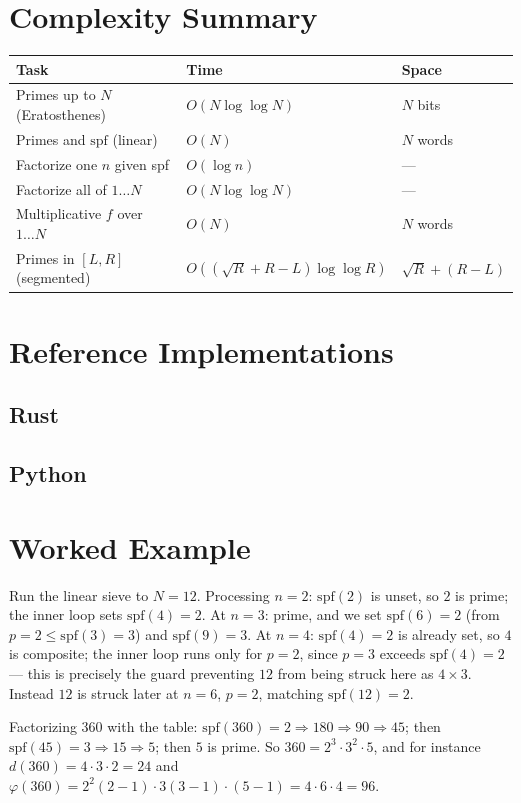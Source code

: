 \documentclass[11pt]{article}
\begin{document}
\section{Complexity Summary}

\begin{center}
\begin{tabular}{lll}
\toprule
\textbf{Task} & \textbf{Time} & \textbf{Space} \\
\midrule
Primes up to $N$ (Eratosthenes)      & $O(N \log\log N)$ & $N$ bits \\
Primes and $\mathrm{spf}$ (linear)   & $O(N)$            & $N$ words \\
Factorize one $n$ given spf          & $O(\log n)$       & --- \\
Factorize all of $1 \ldots N$        & $O(N \log\log N)$ & --- \\
Multiplicative $f$ over $1 \ldots N$ & $O(N)$            & $N$ words \\
Primes in $[L, R]$ (segmented)       & $O((\sqrt R + R - L)\log\log R)$ & $\sqrt R + (R-L)$ \\
\bottomrule
\end{tabular}
\end{center}

\section{Reference Implementations}

\codenote
\subsection{Rust}

\subsection{Python}

\section{Worked Example}
\begin{examplebox}
Run the linear sieve to $N = 12$. Processing $n = 2$: $\mathrm{spf}(2)$ is
unset, so $2$ is prime; the inner loop sets $\mathrm{spf}(4) = 2$. At $n = 3$:
prime, and we set $\mathrm{spf}(6) = 2$ (from $p = 2 \le \mathrm{spf}(3) = 3$)
and $\mathrm{spf}(9) = 3$. At $n = 4$: $\mathrm{spf}(4) = 2$ is already set, so
$4$ is composite; the inner loop runs only for $p = 2$, since $p = 3$ exceeds
$\mathrm{spf}(4) = 2$ --- this is precisely the guard preventing $12$ from
being struck here as $4 \times 3$. Instead $12$ is struck later at $n = 6$,
$p = 2$, matching $\mathrm{spf}(12) = 2$.

Factorizing $360$ with the table: $\mathrm{spf}(360) = 2 \Rightarrow 180
\Rightarrow 90 \Rightarrow 45$; then $\mathrm{spf}(45) = 3 \Rightarrow 15
\Rightarrow 5$; then $5$ is prime. So $360 = 2^3 \cdot 3^2 \cdot 5$, and for
instance $d(360) = 4 \cdot 3 \cdot 2 = 24$ and
$\varphi(360) = 2^2(2{-}1) \cdot 3(3{-}1) \cdot (5{-}1) = 4 \cdot 6 \cdot 4 = 96$.
\end{examplebox}
\end{document}

